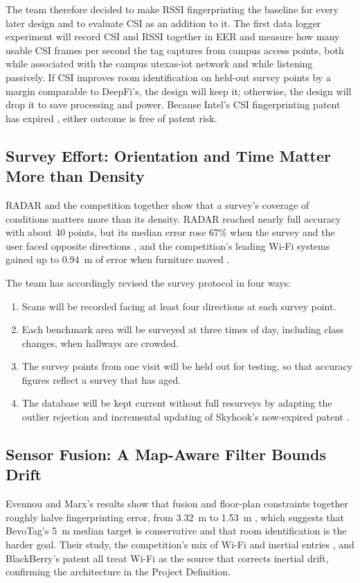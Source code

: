 \documentclass[12pt,letterpaper]{article}
\begin{document}
The team therefore decided to make RSSI fingerprinting the baseline for every later design and to
evaluate CSI as an addition to it. The first data logger experiment will record CSI and RSSI
together in EER and measure how many usable CSI frames per second the tag captures from campus
access points, both while associated with the campus utexas-iot network and while listening
passively. If CSI improves room identification on held-out survey points by a margin comparable to
DeepFi's, the design will keep it; otherwise, the design will drop it to save processing and power.
Because Intel's CSI fingerprinting patent has expired \cite{intel}, either outcome is free of
patent risk.

\subsection{Survey Effort: Orientation and Time Matter More than Density}
RADAR and the competition together show that a survey's coverage of conditions matters more than
its density. RADAR reached nearly full accuracy with about 40 points, but its median error rose
67\% when the survey and the user faced opposite directions \cite{radar}, and the competition's
leading Wi-Fi systems gained up to 0.94~m of error when furniture moved \cite{msilc}.

The team has accordingly revised the survey protocol in four ways:
\begin{enumerate}
  \item Scans will be recorded facing at least four directions at each survey point.
  \item Each benchmark area will be surveyed at three times of day, including class changes, when
    hallways are crowded.
  \item The survey points from one visit will be held out for testing, so that accuracy figures
    reflect a survey that has aged.
  \item The database will be kept current without full resurveys by adapting the outlier rejection
    and incremental updating of Skyhook's now-expired patent \cite{skyhook}.
\end{enumerate}

\subsection{Sensor Fusion: A Map-Aware Filter Bounds Drift}
Evennou and Marx's results show that fusion and floor-plan constraints together roughly halve
fingerprinting error, from 3.32~m to 1.53~m \cite{evennou}, which suggests that BevoTag's 5~m
median target is conservative and that room identification is the harder goal. Their study, the
competition's mix of Wi-Fi and inertial entries \cite{msilc}, and BlackBerry's patent
\cite{blackberry} all treat Wi-Fi as the source that corrects inertial drift, confirming the
architecture in the Project Definition.
\end{document}
